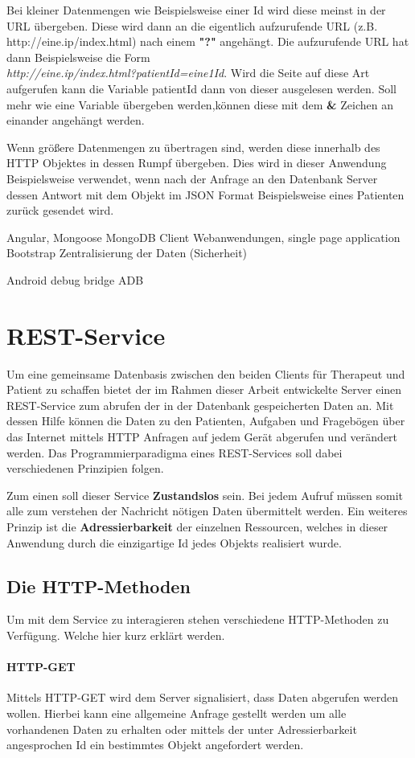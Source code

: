 Bei kleiner Datenmengen wie Beispielsweise einer Id wird diese meinst in der URL übergeben. Diese wird dann an die eigentlich aufzurufende URL (z.B. http://eine.ip/index.html) nach einem \textbf{"?"} angehängt.
Die aufzurufende URL hat dann Beispielsweise die Form \\ \textit{http://eine.ip/index.html?patientId=eine1Id}.
Wird die Seite auf diese Art aufgerufen kann die Variable patientId dann von dieser ausgelesen werden. Soll mehr wie eine Variable übergeben werden,können diese mit dem \textbf{\&} Zeichen an einander angehängt werden.

Wenn größere Datenmengen zu übertragen sind, werden diese innerhalb des HTTP Objektes in dessen Rumpf übergeben. Dies wird in dieser Anwendung Beispielsweise verwendet, wenn nach der Anfrage an den Datenbank Server dessen Antwort mit dem Objekt im JSON Format Beispielsweise eines Patienten zurück gesendet wird.

 Angular, Mongoose MongoDB
 Client Webanwendungen, single page application Bootstrap
 Zentralisierung der Daten (Sicherheit)
 
 Android debug bridge ADB
 
\section{REST-Service}
Um eine gemeinsame Datenbasis zwischen den beiden Clients für Therapeut und Patient zu schaffen bietet der im Rahmen dieser Arbeit entwickelte Server einen REST-Service zum abrufen der in der Datenbank gespeicherten Daten an. Mit dessen Hilfe können die Daten zu den Patienten, Aufgaben und Fragebögen über das Internet mittels HTTP Anfragen auf jedem Gerät abgerufen und verändert werden. Das Programmierparadigma eines REST-Services soll dabei verschiedenen Prinzipien folgen.

Zum einen soll dieser Service \textbf{Zustandslos} sein. Bei jedem Aufruf müssen somit alle zum verstehen der Nachricht nötigen Daten übermittelt werden.
Ein weiteres Prinzip ist die \textbf{Adressierbarkeit} der einzelnen Ressourcen, welches in dieser Anwendung durch die einzigartige Id jedes Objekts realisiert wurde.
\subsection{Die HTTP-Methoden}
Um mit dem Service zu interagieren stehen verschiedene HTTP-Methoden zu Verfügung. Welche hier kurz erklärt werden.
\paragraph{HTTP-GET}
Mittels HTTP-GET wird dem Server signalisiert, dass Daten abgerufen werden wollen. Hierbei kann eine allgemeine Anfrage gestellt werden um alle vorhandenen Daten zu erhalten oder mittels der unter Adressierbarkeit angesprochen Id ein bestimmtes Objekt angefordert werden.
